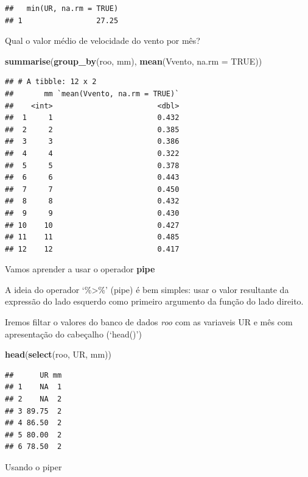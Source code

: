 \documentclass[
]{book}
\newenvironment{Shaded}{\begin{snugshade}}{\end{snugshade}}
\newcommand{\DataTypeTok}[1]{\textcolor[rgb]{0.13,0.29,0.53}{#1}}
\newcommand{\KeywordTok}[1]{\textcolor[rgb]{0.13,0.29,0.53}{\textbf{#1}}}
\newcommand{\NormalTok}[1]{#1}
\newcommand{\OperatorTok}[1]{\textcolor[rgb]{0.81,0.36,0.00}{\textbf{#1}}}
\newcommand{\OtherTok}[1]{\textcolor[rgb]{0.56,0.35,0.01}{#1}}
\newcommand{\StringTok}[1]{\textcolor[rgb]{0.31,0.60,0.02}{#1}}
\begin{document}
\begin{verbatim}
##   min(UR, na.rm = TRUE)
## 1                 27.25
\end{verbatim}

Qual o valor médio de velocidade do vento por mês?

\begin{Shaded}
\begin{Highlighting}[]
\KeywordTok{summarise}\NormalTok{(}\KeywordTok{group_by}\NormalTok{(roo, mm), }\KeywordTok{mean}\NormalTok{(Vvento, }\DataTypeTok{na.rm =} \OtherTok{TRUE}\NormalTok{))}
\end{Highlighting}
\end{Shaded}

\begin{verbatim}
## # A tibble: 12 x 2
##       mm `mean(Vvento, na.rm = TRUE)`
##    <int>                        <dbl>
##  1     1                        0.432
##  2     2                        0.385
##  3     3                        0.386
##  4     4                        0.322
##  5     5                        0.378
##  6     6                        0.443
##  7     7                        0.450
##  8     8                        0.432
##  9     9                        0.430
## 10    10                        0.427
## 11    11                        0.485
## 12    12                        0.417
\end{verbatim}

Vamos aprender a usar o operador \textbf{pipe}

A ideia do operador `\%\textgreater\%' (pipe) é bem simples: usar o valor resultante da expressão do lado esquerdo como primeiro argumento da função do lado direito.

Iremos filtar o valores do banco de dados \emph{roo} com as variaveis UR e mês com apresentação do cabeçalho (`head()')

\begin{Shaded}
\begin{Highlighting}[]
\KeywordTok{head}\NormalTok{(}\KeywordTok{select}\NormalTok{(roo, UR, mm))}
\end{Highlighting}
\end{Shaded}

\begin{verbatim}
##      UR mm
## 1    NA  1
## 2    NA  2
## 3 89.75  2
## 4 86.50  2
## 5 80.00  2
## 6 78.50  2
\end{verbatim}

Usando o piper

\begin{Shaded}
\end{Shaded}
\end{document}
